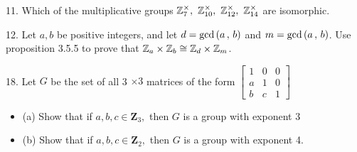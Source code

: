 \begin{mdframed}[style=darkQuesion]
11. Which of the multiplicative groups  $\Z^{\times}_{7},\ \Z^{\times}_{10},\ \Z^{\times}_{12},\ \Z^{\times}_{14}$ are isomorphic.
\end{mdframed}
\begin{mdframed}[style=darkAnswer,frametitle={Joe Starr}]
\end{mdframed}
\newpage
\begin{mdframed}[style=darkQuesion]
12. Let $a,b$ be positive integers, and let $d=\text{gcd}\left(a\,,\,b\right)$ and $m=\text{gcd}\left(a\,,\,b\right)$. 
Use proposition 3.5.5 to prove that $\mathbb{Z}_a\times \mathbb{Z}_b\cong \mathbb{Z}_d\times \mathbb{Z}_m$.
\end{mdframed}
\begin{mdframed}[style=darkAnswer,frametitle={Joe Starr}]
\end{mdframed}
\newpage
\begin{mdframed}[style=darkQuesion]
18. Let $G$ be the set of all 3 $\times 3$ matrices of the form $\left[\begin{array}{lll}1 & 0 & 0 \\ a & 1 & 0 \\ b & c & 1\end{array}\right]$
  \begin{itemize}
    \item []{(a) Show that if $a, b, c \in \mathbf{Z}_{3},$ then $G$ is a group with exponent 3}
    \item []{(b) Show that if $a, b, c \in \mathbf{Z}_{2},$ then $G$ is a group with exponent 4.}
  \end{itemize}
  
  
\end{mdframed}
